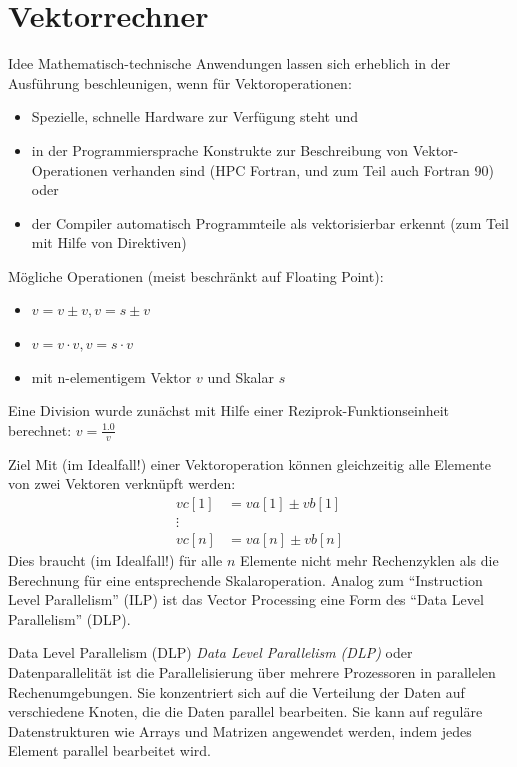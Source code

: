 \section{Vektorrechner}

\begin{defi}[Vektorprozessoren]{Idee}
    Mathematisch-technische Anwendungen lassen sich erheblich in der Ausführung beschleunigen,
    wenn für Vektoroperationen:
    \begin{itemize}
        \item Spezielle, schnelle Hardware zur Verfügung steht und
        \item in der Programmiersprache Konstrukte zur Beschreibung von Vektor-Operationen verhanden sind
              (HPC Fortran, und zum Teil auch Fortran 90) oder
        \item der Compiler automatisch Programmteile als vektorisierbar erkennt
              (zum Teil mit Hilfe von Direktiven)
    \end{itemize}
    Mögliche Operationen (meist beschränkt auf Floating Point):
    \begin{itemize}
        \item $v = v \pm v, v = s \pm v$
        \item $v = v \cdot v, v = s \cdot v$
        \item mit n-elementigem Vektor $v$ und Skalar $s$
    \end{itemize}
    Eine Division wurde zunächst mit Hilfe einer Reziprok-Funktionseinheit berechnet:
    $v = \frac{1.0}{v}$
\end{defi}

\begin{defi}[Vektorprozessoren]{Ziel}
    Mit (im Idealfall!) einer Vektoroperation können gleichzeitig alle Elemente von zwei Vektoren verknüpft werden:
    \begin{align*}
        vc[1] & = va[1] \pm vb[1] \\
        \vdots                    \\
        vc[n] & = va[n] \pm vb[n]
    \end{align*}
    Dies braucht (im Idealfall!) für alle $n$ Elemente nicht mehr Rechenzyklen als die Berechnung für eine entsprechende Skalaroperation.
    Analog zum \enquote{Instruction Level Parallelism} (ILP) ist das Vector Processing eine Form des \enquote{Data Level Parallelism} (DLP).
\end{defi}

\begin{defi}{Data Level Parallelism (DLP)}\label{defi:dlp}
    \emph{Data Level Parallelism (DLP)} oder Datenparallelität ist die Parallelisierung über mehrere Prozessoren in parallelen Rechenumgebungen.
    Sie konzentriert sich auf die Verteilung der Daten auf verschiedene Knoten, die die Daten parallel bearbeiten.
    Sie kann auf reguläre Datenstrukturen wie Arrays und Matrizen angewendet werden, indem jedes Element parallel bearbeitet wird.
\end{defi}


